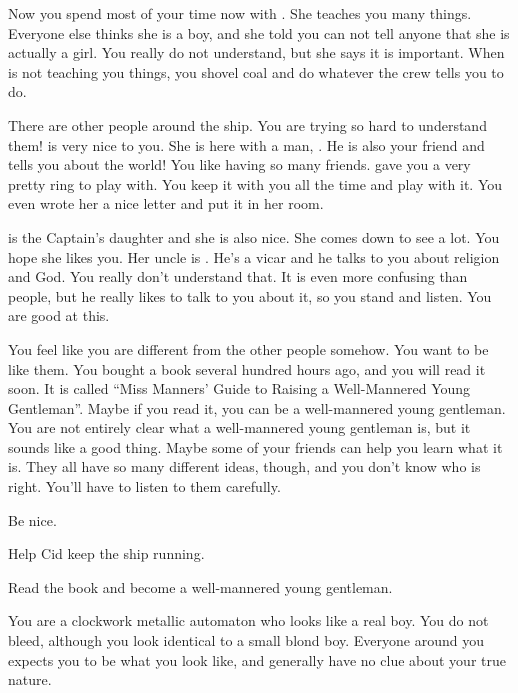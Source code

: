 \documentclass[char]{airship}
\begin{document}
Now you spend most of your time now with \cCid{\intro}. She teaches
you many things. Everyone else thinks she is a boy, and she told you
can not tell anyone that she is actually a girl. You really do not
understand, but she says it is important. When \cCid{} is not teaching
you things, you shovel coal and do whatever the crew tells you to do.

There are other people around the ship. You are trying so hard to
understand them! \cNPCWhore{\intro} is very nice to you. She is here
with a man, \cDealer{\intro}. He is also your friend and tells you
about the world! You like having so many friends. \cNPCWhore{} gave
you a very pretty ring to play with. You keep it with you all the time
and play with it. You even wrote her a nice letter and put it in her
room.

\cThief{\intro} is the Captain's daughter and she is also nice. She
comes down to see \cCid{} a lot. You hope she likes you. Her uncle is
\cVicar{\uncle}. He's a vicar and he talks to you about religion and
God. You really don't understand that. It is even more confusing than
people, but he really likes to talk to you about it, so you stand and
listen. You are good at this.

You feel like you are different from the other people somehow. You
want to be like them. You bought a book several hundred hours ago, and
you will read it soon. It is called ``Miss Manners' Guide to Raising a
Well-Mannered Young Gentleman''. Maybe if you read it, you can be a
well-mannered young gentleman. You are not entirely clear what a
well-mannered young gentleman is, but it sounds like a good
thing. Maybe some of your friends can help you learn what it is. They
all have so many different ideas, though, and you don't know who is
right. You'll have to listen to them carefully.


\begin{itemz}[Goals]
  \item Be nice.
  \item Help Cid keep the ship running.
  \item Read the book and become a well-mannered young gentleman.
\end{itemz}

\begin{itemz}[Notes]
  \item You are a clockwork metallic automaton who looks like a real boy. You do not bleed, although you look identical to a small blond boy.  Everyone around you expects you to be what you look like, and generally have no clue about your true nature.
\end{itemz}
\end{document}
